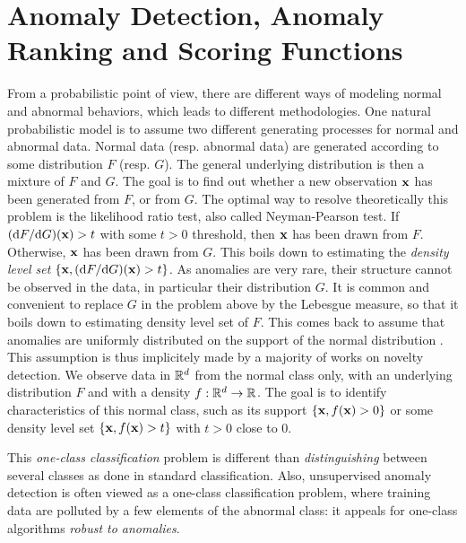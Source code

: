 \section{Anomaly Detection, Anomaly Ranking and Scoring Functions}
\label{resume:scoring_function}
From a probabilistic point of view, there are different ways of modeling normal and abnormal behaviors, which leads to different methodologies. One natural probabilistic model is to assume two different generating processes for normal and abnormal data. Normal data (resp. abnormal data) are generated according to some distribution $F$ (resp. $G$). The general underlying distribution is then a mixture of $F$ and $G$. The goal is to find out whether a new observation $\mathbf x$ has been generated from $F$, or from $G$. The optimal way to resolve theoretically this problem is the likelihood ratio test, also called Neyman-Pearson test. If $(\mathrm{d}  F / \mathrm{d}  G) ( \mathbf x) > t$ with some $t>0$ threshold, then $\mathbf x$ has been drawn from $F$. Otherwise, $\mathbf x$ has been drawn from $G$. This boils down to estimating the \emph{density level set} $\{\mathbf x, (\mathrm{d} F / \mathrm{d}  G) (\mathbf x) > t\}$.
%
As anomalies are very rare, their structure cannot be observed in the data, in particular their distribution $G$. 
%
It is common and convenient to replace $G$ in the problem above by the Lebesgue measure, so that it boils down to estimating density level set of $F$.
This comes back to assume that anomalies are uniformly distributed on the support of the normal distribution \citep{Blanchard2010}. This assumption is thus implicitely made by a majority of works on novelty detection.
We observe data in $\mathbb{R}^d$ from the normal class only, with an underlying distribution $F$ and with a density $f: \mathbb{R}^d \to \mathbb{R}$. 
The goal is to identify characteristics of this normal class, such as its support $\{\mathbf x, f( \mathbf x) > 0\}$ or some density level set $\{\mathbf x, f( \mathbf x) > t\}$ with $t>0$ close to $0$.

This \emph{one-class classification} problem is different than \emph{distinguishing} between several classes as done in standard classification. Also, unsupervised anomaly detection is often viewed as a one-class classification problem, where training data are polluted by a few elements of the abnormal class: it appeals for one-class algorithms \emph{robust to anomalies}. 

